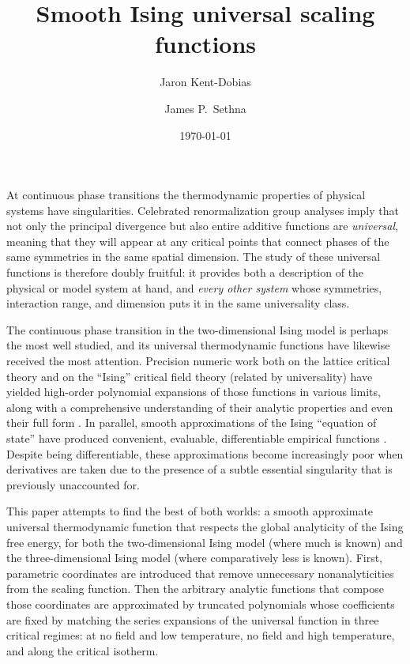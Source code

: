 \documentclass[
  aps,
  prb,
  reprint,
  longbibliography,
  floatfix
]{revtex4-2}
\begin{document}
\title{Smooth Ising universal scaling functions}

\author{Jaron Kent-Dobias}

\author{James P.~Sethna}

\date\today

\begin{abstract}
\end{abstract}

\maketitle

At continuous phase transitions the thermodynamic properties of physical
systems have singularities. Celebrated renormalization group analyses imply
that not only the principal divergence but also entire additive functions are
\emph{universal}, meaning that they will appear at any critical points that
connect phases of the same symmetries in the same spatial dimension. The study
of these universal functions is therefore doubly fruitful: it provides both a
description of the physical or model system at hand, and \emph{every other
system} whose symmetries, interaction range, and dimension puts it in the same
universality class.

The continuous phase transition in the two-dimensional Ising model is perhaps
the most well studied, and its universal thermodynamic functions have likewise
received the most attention. Precision numeric work both on the lattice
critical theory and on the ``Ising'' critical field theory (related by
universality) have yielded high-order polynomial expansions of those functions
in various limits, along with a comprehensive understanding of their analytic
properties and even their full form \cite{Fonseca_2003_Ising, Mangazeev_2008_Variational, Mangazeev_2010_Scaling}. In parallel, smooth approximations of the
Ising ``equation of state'' have produced convenient, evaluable, differentiable
empirical functions \cite{Guida_1997_3D, Campostrini_2000_Critical, Caselle_2001_The}. Despite being differentiable, these approximations become
increasingly poor when derivatives are taken due to the presence of a subtle
essential singularity that is previously unaccounted for.

This paper attempts to find the best of both worlds: a smooth approximate
universal thermodynamic function that respects the global analyticity of the
Ising free energy, for both the two-dimensional Ising model (where much is
known) and the three-dimensional Ising model (where comparatively less is
known). First, parametric coordinates are introduced that remove unnecessary
nonanalyticities from the scaling function. Then the arbitrary analytic
functions that compose those coordinates are approximated by truncated
polynomials whose coefficients are fixed by matching the series expansions of
the universal function in three critical regimes: at no field and low
temperature, no field and high temperature, and along the critical isotherm.
\end{document}
